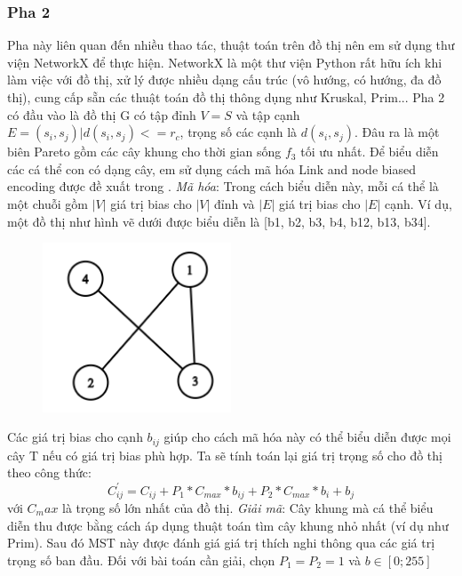 \documentclass{article}
\begin{document}
\subsubsection{Pha 2}
Pha này liên quan đến nhiều thao tác, thuật toán trên đồ thị nên em sử dụng thư viện NetworkX \cite{hagberg2008exploring} để thực hiện. NetworkX là một thư viện Python rất hữu ích khi làm việc với đồ thị, xử lý được  nhiều dạng cấu trúc  (vô hướng, có hướng, đa đồ thị), cung cấp sẵn các thuật toán đồ thị thông dụng như Kruskal, Prim...
Pha 2 có đầu vào là đồ thị G có tập đỉnh $V = S$ và tập cạnh $E = {(s_i, s_j) | d(s_i, s_j) <= r_c}$, trọng số các cạnh là $d(s_i, s_j)$. Đâu ra là một biên Pareto gồm các cây khung cho thời gian sống $f_3$ tối ưu nhất.
Để biểu diễn các cá thể con có dạng cây, em sử dụng cách mã hóa Link and node biased encoding được đề xuất trong \cite{palmer1994representing}.
\newline \emph{Mã hóa}: Trong cách biểu diễn này, mỗi cá thể là một chuỗi gồm $|V|$ giá trị bias cho $|V|$ đỉnh và $|E|$ giá trị bias cho $|E|$ cạnh. Ví dụ, một đồ thị như hình vẽ dưới được biểu diễn là [b1, b2, b3, b4, b12, b13, b34]. 
\begin{figure}[ht]
\includegraphics[width=0.5\textwidth]{images/graph.PNG}
\end{figure}
Các giá trị bias cho cạnh $b_{ij}$ giúp cho cách mã hóa này có thể biểu diễn được mọi cây T nếu có giá trị bias phù hợp.
Ta sẽ tính toán lại giá trị trọng số cho đồ thị theo công thức:
\begin{equation}
    C^{'}_{ij} = C_{ij} + P_1*C_{max}*b_{ij} + P_2*C_{max}*{b_i + b_j}
\end{equation}
với $C_max$ là trọng số lớn nhất của đồ thị.
\newline \emph{Giải mã}:  Cây khung mà cá thể biểu diễn thu được bằng cách áp dụng thuật toán tìm cây khung nhỏ nhất (ví dụ như Prim). Sau đó MST này được đánh giá giá trị thích nghi thông qua các giá trị trọng số ban đầu.
\newline Đối với bài toán cần giải, chọn $P_1 = P_2 = 1$ và $b \in [0; 255]$
\end{document}
